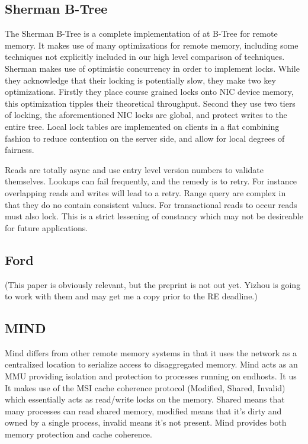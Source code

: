 \subsection{Sherman B-Tree~\cite{sherman}}

The Sherman B-Tree is a complete implementation of at B-Tree for remote memory.
It makes use of many optimizations for remote memory, including some techniques
not explicitly included in our high level comparison of techniques. Sherman
makes use of optimistic concurrency in order to implement locks. While they
acknowledge that their locking is potentially slow, they make two key
optimizations. Firstly they place course grained locks onto NIC device memory,
this optimization tipples their theoretical throughput. Second they use two
tiers of locking, the aforementioned NIC locks are global, and protect writes to the
entire tree. Local lock tables are implemented on clients in a flat combining
fashion to reduce contention on the server side, and allow for local degrees of
fairness.

Reads are totally async and use entry level version numbers to validate
themselves. Lookups can fail frequently, and the remedy is to retry. For
instance overlapping reads and writes will lead to a retry. Range query are
complex in that they do no contain consistent values. For transactional reads to
occur reads must also lock. This is a strict lessening of constancy which may
not be desireable for future applications.

\subsection{Ford~\cite{ford}}

(This paper is obviously relevant, but the preprint is not out yet. Yizhou is
going to work with them and may get me a copy prior to the RE deadline.)

\subsection{MIND~\cite{mind}}

Mind differs from other remote memory systems in that it uses the network as a
centralized location to serialize access to disaggregated memory. Mind acts as an
MMU providing isolation and protection to processes running on endhosts. It us  
It makes use of the MSI cache coherence protocol (Modified, Shared, Invalid)
which essentially acts as read/write locks on the memory. Shared means that many
processes can read shared memory, modified means that it's dirty and owned by a
single process, invalid means it's not present. Mind provides both memory
protection and cache coherence. 

